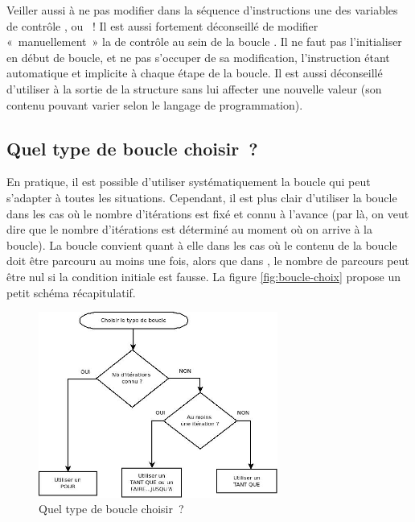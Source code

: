 		Veiller aussi à ne pas modifier dans la séquence d’instructions une des
		variables de contrôle ,  ou ~! Il
		est aussi fortement déconseillé de modifier «~manuellement~» la
		 de contrôle au sein de la boucle
		. Il ne faut pas l’initialiser en début de boucle,
		et ne pas s’occuper de sa modification, l’instruction 
		étant automatique et implicite à chaque étape de la
		boucle. Il est aussi déconseillé d’utiliser  à la
		sortie de la structure  sans lui affecter une
		nouvelle valeur (son contenu pouvant varier selon le langage de
		programmation).

	\subsection{Quel type de boucle choisir~?}

		En pratique, il est possible d’utiliser systématiquement la boucle 
		 qui peut s’adapter à toutes les situations. 
		Cependant, il est plus clair d’utiliser la boucle  
		dans les cas où le nombre d’itérations est fixé et connu à l’avance 
		(par là, on veut dire que le nombre d’itérations est déterminé au moment 
		où on arrive à la boucle). 
		La boucle  convient quant à elle
		dans les cas où le contenu de la boucle doit être parcouru au moins une
		fois, alors que dans , 
		le nombre de parcours peut être nul si la condition initiale est fausse. 
		La figure \vref{fig:boucle-choix} propose un petit schéma récapitulatif.

		\begin{figure}[h]
		\centering
		\includegraphics[width=0.7\textwidth]{image/boucle-choixtype}
		\caption{Quel type de boucle choisir~?}
		\label{fig:boucle-choix}
		\end{figure}

